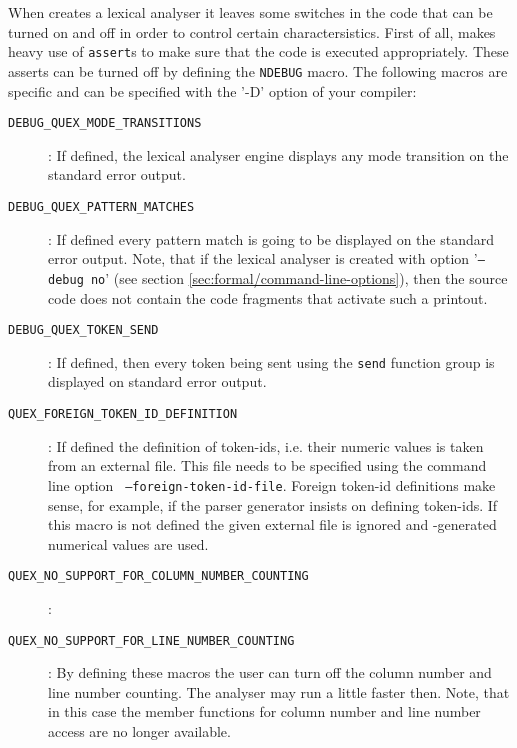 When {\quex} creates a lexical analyser it leaves some switches in the code
that can be turned on and off in order to control certain
charactersistics. First of all, {\quex} makes heavy use of {\tt assert}s to
make sure that the code is executed appropriately. These asserts can be turned
off by defining the {\tt NDEBUG} macro.  The following macros are {\quex}
specific and can be specified with the '-D' option of your compiler:

\begin{description}

\item[\tt DEBUG\_QUEX\_MODE\_TRANSITIONS]: If defined, the lexical analyser
engine displays any mode transition on the standard error output. 

\item[\tt DEBUG\_QUEX\_PATTERN\_MATCHES]: If defined every pattern match is
  going to be displayed on the standard error output. Note, that if the
  lexical analyser is created with option '{\tt --debug no}' (see section
  \ref{sec:formal/command-line-options}), then the source code does not
  contain the code fragments that activate such a printout.

  
\item[\tt DEBUG\_QUEX\_TOKEN\_SEND]: If defined, then every token being sent
  using the {\tt send} function group is displayed on standard error output.
  
\item[\tt QUEX\_FOREIGN\_TOKEN\_ID\_DEFINITION]: If defined the definition of
  token-ids, i.e. their numeric values is taken from an external file.  This
  file needs to be specified using the command line option {\tt
    --foreign-token-id-file}. Foreign token-id definitions make sense, for
  example, if the parser generator insists on defining token-ids.  If this
  macro is not defined the given external file is ignored and
  {\quex}-generated numerical values are used.

        
\item[\tt QUEX\_NO\_SUPPORT\_FOR\_COLUMN\_NUMBER\_COUNTING]: 
  
\item[\tt QUEX\_NO\_SUPPORT\_FOR\_LINE\_NUMBER\_COUNTING]: By defining these
  macros the user can turn off the column number and line number counting. The
  analyser may run a little faster then. Note, that in this case the member
  functions for column number and line number access are no longer available.
        
\end{description}
